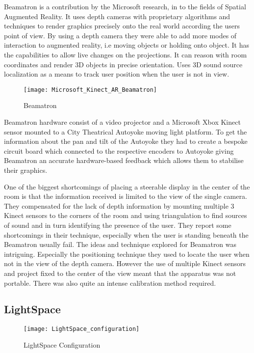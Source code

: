 Beamatron \cite{beamatron} is a contribution by the Microsoft research,
in to the fields of Spatial Augmented Reality. It uses depth cameras
with proprietary algorithms and techniques to render graphics precisely
onto the real world according the users point of view. By using a
depth camera they were able to add more modes of interaction to augmented
reality, i.e moving objects or holding onto object. It has the capabilities
to allow live changes on the projections. It can reason with room
coordinates and render 3D objects in precise orientation. Uses 3D
sound source localization as a means to track user position when the
user is not in view. 
\begin{figure}
\centering
\texttt{[image: Microsoft\_Kinect\_AR\_Beamatron]}
\protect\caption{Beamatron}
\end{figure}
Beamatron hardware consist of a video projector and a Microsoft Xbox
Kinect sensor mounted to a City Theatrical Autoyoke\cite{autoyoke}
moving light platform. To get the information about the pan and tilt
of the Autoyoke they had to create a bespoke circuit board which connected
to the respective encoders to Autoyoke giving Beamatron an accurate
hardware-based feedback which allows them to stabilise their graphics. 

One of the biggest shortcomings of placing a steerable display in
the center of the room is that the information received is limited
to the view of the single camera. They compensated for the lack of
depth information by mounting multiple 3 Kinect sensors to the corners
of the room and using triangulation to find sources of sound and in
turn identifying the presence of the user. They report some shortcomings
in their technique, especially when the user is standing beneath the
Beamatron usually fail.
The ideas and technique explored for Beamatron was intriguing. Especially
the positioning technique they used to locate the user when not in
the view of the depth camera. However the use of multiple Kinect sensors
and project fixed to the center of the view meant that the apparatus
was not portable. There was also quite an intense calibration method
required.


\subsection{LightSpace}
\begin{figure}[H]
\centering
\texttt{[image: LightSpace\_configuration]}
\protect\caption{LightSpace Configuration}
\label{lightspace-config}
\end{figure}

